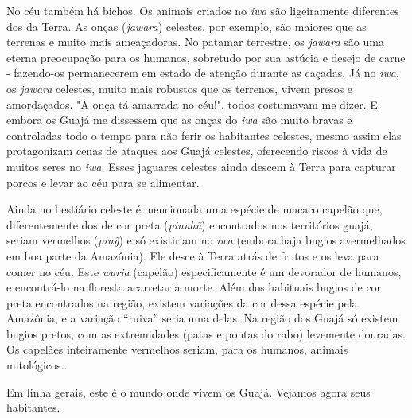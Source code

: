 No céu também há bichos. Os animais criados no \emph{iwa} são
ligeiramente diferentes dos da Terra. As onças (\emph{jawara}) celestes,
por exemplo, são maiores que as terrenas e muito mais ameaçadoras. No
patamar terrestre, os \emph{jawara} são uma eterna preocupação para os
humanos, sobretudo por sua astúcia e desejo de carne - fazendo-os
permanecerem em estado de atenção durante as caçadas. Já no \emph{iwa},
os \emph{jawara} celestes, muito mais robustos que os terrenos, vivem
presos e amordaçados. "A onça tá amarrada no céu!", todos costumavam me
dizer. E embora os Guajá me dissessem que as onças do \emph{iwa} são
muito bravas e controladas todo o tempo para não ferir os habitantes
celestes, mesmo assim elas protagonizam cenas de ataques aos Guajá
celestes, oferecendo riscos à vida de muitos seres no \emph{iwa}. Esses
jaguares celestes ainda descem à Terra para capturar porcos e levar ao
céu para se alimentar.

Ainda no bestiário celeste é mencionada uma espécie de macaco capelão
que, diferentemente dos de cor preta (\emph{pinuhũ}) encontrados nos
territórios guajá, seriam vermelhos (\emph{pinỹ}) e só existiriam no
\emph{iwa} (embora haja bugios avermelhados em boa parte da Amazônia).
Ele desce à Terra atrás de frutos e os leva para comer no céu. Este
\emph{waria} (capelão) especificamente é um devorador de humanos, e
encontrá-lo na floresta acarretaria morte. Além dos habituais bugios de
cor preta encontrados na região, existem variações da cor dessa espécie
pela Amazônia, e a variação ``ruiva'' seria uma delas. Na região dos
Guajá só existem bugios pretos, com as extremidades (patas e pontas do
rabo) levemente douradas. Os capelães inteiramente vermelhos seriam,
para os humanos, animais mitológicos..

Em linha gerais, este é o mundo onde vivem os Guajá. Vejamos agora seus
habitantes.
